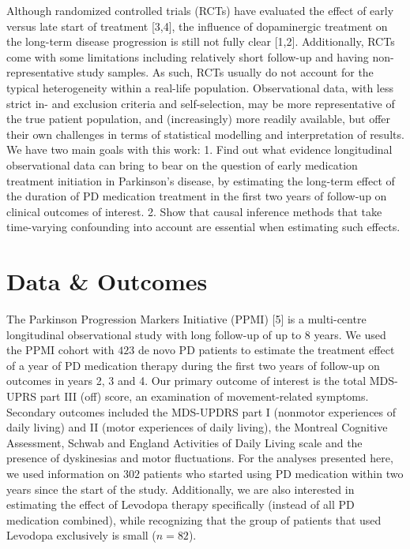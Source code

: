 \documentclass[final]{article}
\begin{document}
Although randomized controlled trials (RCTs) have evaluated the effect of early versus late start of treatment [3,4], the influence of dopaminergic treatment on the long-term disease progression is still not fully clear [1,2]. Additionally, RCTs come with some limitations including relatively short follow-up and having non-representative study samples. As such, RCTs usually do not account for the typical heterogeneity within a real-life population. Observational data, with less strict in- and exclusion criteria and self-selection, may be more representative of the true patient population, and (increasingly) more readily available, but offer their own challenges in terms of statistical modelling and interpretation of results. We have two main goals with this work: 1. Find out what evidence longitudinal observational data can bring to bear on the question of early medication treatment initiation in Parkinson's disease, by estimating the long-term effect of the duration of PD medication treatment in the first two years of follow-up on clinical outcomes of interest. 2. Show that causal inference methods that take time-varying confounding into account are essential when estimating such effects.

\section*{Data \& Outcomes}
The Parkinson Progression Markers Initiative (PPMI) [5] is a multi-centre longitudinal observational study with long follow-up of up to 8 years. We used the PPMI cohort with $423$ de novo PD patients to estimate the treatment effect of a year of PD medication therapy during the first two years of follow-up on outcomes in years 2, 3 and 4. Our primary outcome of interest is the total MDS-UPRS part III (off) score, an examination of movement-related symptoms. Secondary outcomes included the MDS-UPDRS part I (nonmotor experiences of daily living) and II (motor experiences of daily living), the Montreal Cognitive Assessment, Schwab and England Activities of Daily Living scale and the presence of dyskinesias and motor fluctuations. For the analyses presented here, we used information on $302$ patients who started using PD medication within two years since the start of the study. Additionally, we are also interested in estimating the effect of Levodopa therapy specifically (instead of all PD medication combined), while recognizing that the group of patients that used Levodopa exclusively is small ($n=82$).
\end{document}
